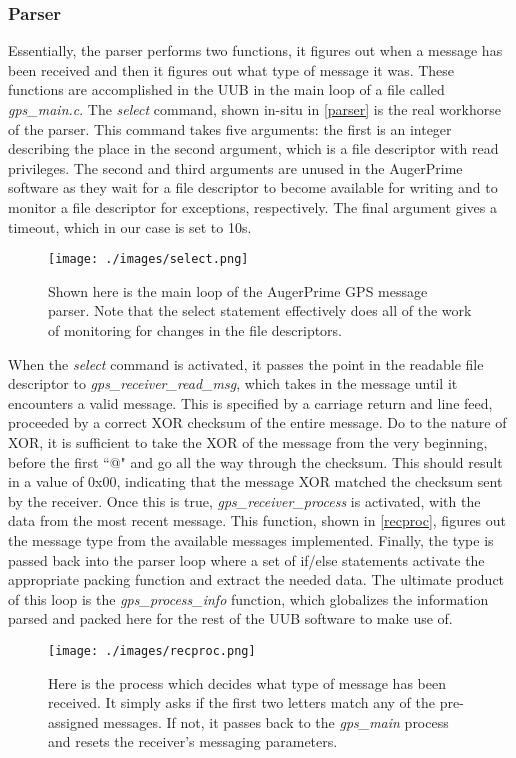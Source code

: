 \subsubsection{Parser}
Essentially, the parser performs two functions, it figures out when a message has been received and then it figures out what type of message it was. These functions are accomplished in the UUB in the main loop of a file called \textit{gps\_main.c}. The \textit{select} command, shown in-situ in \autoref{parser} is the real workhorse of the parser. This command takes five arguments: the first is an integer describing the place in the second argument, which is a file descriptor with read privileges. The second and third arguments are unused in the AugerPrime software as they wait for a file descriptor to become available for writing and to monitor a file descriptor for exceptions, respectively. The final argument gives a timeout, which in our case is set to 10s. 
\begin{figure}[h!]
\centering
\texttt{[image: ./images/select.png]}
\caption[GPS Parser Loop]{Shown here is the main loop of the AugerPrime GPS message parser. Note that the select statement effectively does all of the work of monitoring for changes in the file descriptors.}
\label{parser}
\end{figure}
When the \textit{select} command is activated, it passes the point in the readable file descriptor to \textit{gps\_receiver\_read\_msg}, which takes in the message until it encounters a valid message. This is specified by a carriage return and line feed, proceeded by a correct XOR checksum of the entire message. Do to the nature of XOR, it is sufficient to take the XOR of the message from the very beginning, before the first ``@" and go all the way through the checksum. This should result in a value of 0x00, indicating that the message XOR matched the checksum sent by the receiver. Once this is true, \textit{gps\_receiver\_process} is activated, with the data from the most recent message. This function, shown in \autoref{recproc}, figures out the message type from the available messages implemented. Finally, the type is passed back into the parser loop where a set of if/else statements activate the appropriate packing function and extract the needed data. The ultimate product of this loop is the \textit{gps\_process\_info} function, which globalizes the information parsed and packed here for the rest of the UUB software to make use of.
\begin{figure}[h!]
\centering
\texttt{[image: ./images/recproc.png]}
\caption[GPS Receiver Process]{Here is the process which decides what type of message has been received. It simply asks if the first two letters match any of the pre-assigned messages. If not, it passes back to the \textit{gps\_main} process and resets the receiver's messaging parameters.}
\label{recproc}
\end{figure}
